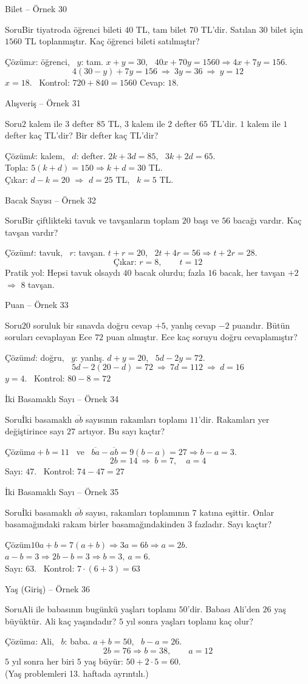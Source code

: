 \documentclass[aspectratio=169,11pt,handout]{beamer}
\newcommand{\soru}[3]{%
\begin{frame}{#1}
  \begin{block}{Soru}\large #2\end{block}
  \pause
  \begin{exampleblock}{Çözüm}\large #3\end{exampleblock}
\end{frame}}
\newcommand{\ab}[1]{\overline{#1}}
\begin{document}
\soru{Bilet -- Örnek 30}
{Bir tiyatroda öğrenci bileti \(40\) TL, tam bilet \(70\) TL'dir. Satılan \(30\) bilet için \(1560\) TL toplanmıştır. Kaç öğrenci bileti satılmıştır?}
{\(x\): öğrenci, \ \(y\): tam. \quad \(x+y=30\), \ \(40x+70y=1560\Rightarrow 4x+7y=156\).
\[4(30-y)+7y=156\ \Rightarrow\ 3y=36\ \Rightarrow\ y=12\]
\(x=18\). \ Kontrol: \(720+840=1560\) \checkmark \quad Cevap: \(18\).}

\soru{Alışveriş -- Örnek 31}
{\(2\) kalem ile \(3\) defter \(85\) TL, \(3\) kalem ile \(2\) defter \(65\) TL'dir. \(1\) kalem ile \(1\) defter kaç TL'dir? Bir defter kaç TL'dir?}
{\(k\): kalem, \ \(d\): defter. \quad \(2k+3d=85\), \ \(3k+2d=65\).\\[3pt]
Topla: \(5(k+d)=150\Rightarrow k+d=30\) TL.\\[3pt]
Çıkar: \(d-k=20\) \(\Rightarrow\) \(d=25\) TL, \ \(k=5\) TL.}

\soru{Bacak Sayısı -- Örnek 32}
{Bir çiftlikteki tavuk ve tavşanların toplam \(20\) başı ve \(56\) bacağı vardır. Kaç tavşan vardır?}
{\(t\): tavuk, \ \(r\): tavşan. \quad \(t+r=20\), \ \(2t+4r=56\Rightarrow t+2r=28\).
\[\text{Çıkar: } r=8,\qquad t=12\]
Pratik yol: Hepsi tavuk olsaydı \(40\) bacak olurdu; fazla \(16\) bacak, her tavşan \(+2\) \(\Rightarrow\) \(8\) tavşan.}

\soru{Puan -- Örnek 33}
{\(20\) soruluk bir sınavda doğru cevap \(+5\), yanlış cevap \(-2\) puandır. Bütün soruları cevaplayan Ece \(72\) puan almıştır. Ece kaç soruyu doğru cevaplamıştır?}
{\(d\): doğru, \ \(y\): yanlış. \quad \(d+y=20\), \ \(5d-2y=72\).
\[5d-2(20-d)=72\ \Rightarrow\ 7d=112\ \Rightarrow\ d=16\]
\(y=4\). \ Kontrol: \(80-8=72\) \checkmark}

\soru{İki Basamaklı Sayı -- Örnek 34}
{İki basamaklı \(\ab{ab}\) sayısının rakamları toplamı \(11\)'dir. Rakamları yer değiştirince sayı \(27\) artıyor. Bu sayı kaçtır?}
{\(a+b=11\) \ ve \ \(\ab{ba}-\ab{ab}=9(b-a)=27\Rightarrow b-a=3\).
\[2b=14\ \Rightarrow\ b=7,\quad a=4\]
Sayı: \(47\). \ Kontrol: \(74-47=27\) \checkmark}

\soru{İki Basamaklı Sayı -- Örnek 35}
{İki basamaklı \(\ab{ab}\) sayısı, rakamları toplamının \(7\) katına eşittir. Onlar basamağındaki rakam birler basamağındakinden \(3\) fazladır. Sayı kaçtır?}
{\(10a+b=7(a+b)\Rightarrow 3a=6b\Rightarrow a=2b\).\\[3pt]
\(a-b=3\Rightarrow 2b-b=3\Rightarrow b=3,\ a=6\).\\[3pt]
Sayı: \(63\). \ Kontrol: \(7\cdot(6+3)=63\) \checkmark}

\soru{Yaş (Giriş) -- Örnek 36}
{Ali ile babasının bugünkü yaşları toplamı \(50\)'dir. Babası Ali'den \(26\) yaş büyüktür. Ali kaç yaşındadır? \(5\) yıl sonra yaşları toplamı kaç olur?}
{\(a\): Ali, \ \(b\): baba. \quad \(a+b=50\), \ \(b-a=26\).
\[2b=76\Rightarrow b=38,\qquad a=12\]
\(5\) yıl sonra her biri \(5\) yaş büyür: \(50+2\cdot 5=60\).\\
{\normalsize (Yaş problemleri 13. haftada ayrıntılı.)}}
\end{document}
